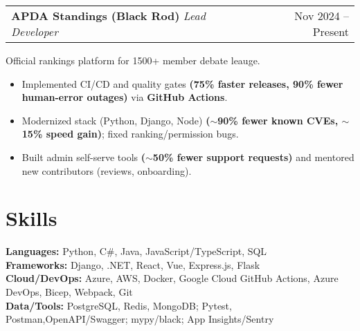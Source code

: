 \documentclass[11pt]{article}
\makeatletter
\newcommand{\BulletSize}{10}
\newcommand{\BulletLead}{12}
\newcommand{\BlurbSize}{10}
\newcommand{\BlurbLead}{12}
\newcommand{\BlurbPre}{0pt}
\newcommand{\BlurbPost}{-8pt}
\newcommand{\SkillsSize}{10}
\newcommand{\SkillsLead}{12}
\newcommand{\SkillsLabelWeight}{\bfseries}
\newenvironment{twocol}[2]{%
  \noindent\begin{tabular*}{\textwidth}{@{\extracolsep{\fill}} l r}
  #1 & #2\\
  \end{tabular*}\ignorespaces
}{\par}
\newenvironment{ResumeItemize}{%
  \begin{itemize}\fontsize{\BulletSize}{\BulletLead}\selectfont
}{%
  \end{itemize}
}
\newcommand{\ProjectBlurb}[1]{%
  \vspace*{\BlurbPre}%
  {\fontsize{\BlurbSize}{\BlurbLead}\selectfont #1}%
  \\[\BlurbPost]%
}
\newcommand{\SkillsLine}[2]{%
  {\fontsize{\SkillsSize}{\SkillsLead}\selectfont \SkillsLabelWeight #1: }%
  {\fontsize{\SkillsSize}{\SkillsLead}\selectfont #2}\\
}
\makeatother
\begin{document}
\begin{twocol}{\textbf{APDA Standings (Black Rod)} \;\textit{Lead Developer}}{Nov 2024 -- Present}\end{twocol}
\ProjectBlurb{Official rankings platform for 1500+ member debate leauge.}
\begin{ResumeItemize}
  \item Implemented CI/CD and quality gates \textbf{(75\% faster releases, 90\% fewer human-error outages)} via \textbf{GitHub Actions}.
  \item Modernized stack (Python, Django, Node) \textbf{(\(\sim\)90\% fewer known CVEs, \(\sim\)15\% speed gain)}; fixed ranking/permission bugs.
  \item Built admin self-serve tools \textbf{(\(\sim\)50\% fewer support requests)} and mentored new contributors (reviews, onboarding).
\end{ResumeItemize}
\section{Skills}
\SkillsLine{Languages}{Python, C\#, Java, JavaScript/TypeScript, SQL}
\SkillsLine{Frameworks}{Django, .NET, React, Vue, Express.js, Flask}
\SkillsLine{Cloud/DevOps}{Azure, AWS, Docker, Google Cloud GitHub Actions, Azure DevOps, Bicep, Webpack, Git}
\SkillsLine{Data/Tools}{PostgreSQL, Redis, MongoDB; Pytest, Postman,OpenAPI/Swagger; mypy/black; App Insights/Sentry}
\enlargethispage{\footskip}
\end{document}
